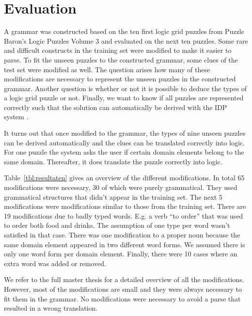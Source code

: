 \section{Evaluation}
A grammar was constructed based on the ten first logic grid puzzles from Puzzle Baron's Logic Puzzles Volume 3 \cite{logigrammen} and evaluated on the next ten puzzles. Some rare and difficult constructs in the training set were modified to make it easier to parse. To fit the unseen puzzles to the constructed grammar, some clues of the test set were modified as well. The question arises how many of these modifications are necessary to represent the unseen puzzles in the constructed grammar. Another question is whether or not it is possible to deduce the types of a logic grid puzzle or not. Finally, we want to know if all puzzles are represented correctly such that the solution can automatically be derived with the IDP system \cite{IDP}.

It turns out that once modified to the grammar, the types of nine unseen puzzles can be derived automatically and the clues can be translated correctly into logic. For one puzzle the system asks the user if certain domain elements belong to the same domain. Thereafter, it does translate the puzzle correctly into logic.

Table~\ref{tbl:resultaten} gives an overview of the different modifications. In total 65 modifications were necessary, 30 of which were purely grammatical. They used grammatical structures that didn't appear in the training set. The next 5 modifications were modifications similar to those from the training set. There are 19 modifications due to badly typed words. E.g. a verb ``to order'' that was used to order both food and drinks. The assumption of one type per word wasn't satisfied in that case. There was one modification to a proper noun because the same domain element appeared in two different word forms. We assumed there is only one word form per domain element. Finally, there were 10 cases where an extra word was added or removed.

We refer to the full master thesis for a detailed overview of all the modifications. However, most of the modifications are small and they were always necessary to fit them in the grammar. No modifications were necessary to avoid a parse that resulted in a wrong translation.

